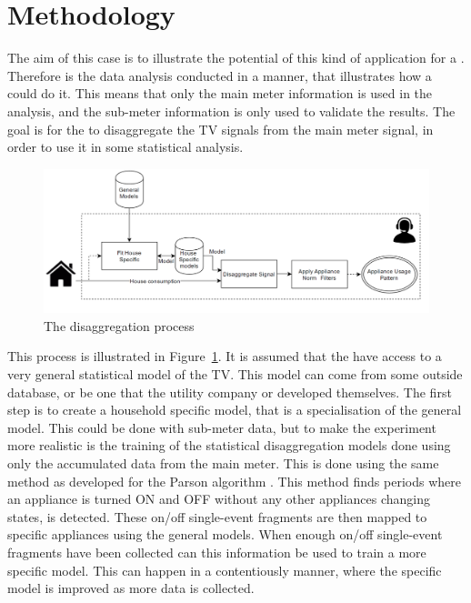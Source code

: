 \section{Methodology}
The aim of this case is to illustrate the potential of this kind of application for a . Therefore is the data analysis conducted in a manner, that illustrates how a  could do it. This means that only the main meter information is used in the analysis, and the sub-meter information is only used to validate the results.  The goal is for the  to disaggregate the TV signals from the main meter signal, in order to use it in some statistical analysis. 

\begin{figure}[H]
\centering
\includegraphics[width=1\textwidth]{billeder/Electric company method.png}
\caption{The disaggregation process}
\label{fig:ECM}
\end{figure}

This process is illustrated in Figure~\ref{fig:ECM}. It is assumed that the  have access to a very general statistical model of the TV. This model can come from some outside database, or be one that the utility company or  developed themselves. The first step is to create a household specific model, that is a specialisation of the general model. This could be done with sub-meter data, but to make the experiment more realistic is the training of the statistical disaggregation models done using only the accumulated data from the main meter. This is done using the same method as developed for the Parson algorithm \citep{RefWorks:28}. This method finds periods where an appliance is turned ON and OFF without any other appliances changing states, is detected. These on/off single-event fragments are then mapped to specific appliances using the general models. When enough on/off single-event fragments have been collected can this information be used to train a more specific model. This can happen in a contentiously manner, where the specific model is improved as more data is collected.  

